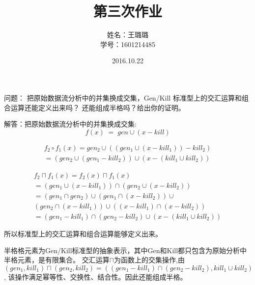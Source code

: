 \documentclass[a4paper,12pt]{article}
\begin{document}
\begin{CJK}{UTF8}{gbsn}
\title{第三次作业}
\author{姓名：王璐璐 \\ 学号：1601214485}
\date{2016.10.22}
\maketitle
	问题：
	把原始数据流分析中的并集换成交集，Gen/Kill
	标准型上的交汇运算和组合运算还能定义出来吗？
	还能组成半格吗？给出你的证明。
	
	解答：把原始数据流分析中的并集换成交集:
	\[
		f\left( x \right)\; =\; gen\cup \left( x-kill \right)
	\]
	
	\[\begin{array}{l}
		{f_2} \circ {f_1}(x) = ge{n_2} \cup ((ge{n_1} \cup (x - kil{l_1})) - kil{l_2})\\
	 	= (ge{n_2} \cup (ge{n_1} - kil{l_2})) \cup (x - (kil{l_1} \cup kil{l_2}))
	\end{array}\]
	
	\[\begin{array}{l}
		{f_2} \sqcap {f_1}(x) = {f_2}(x) \sqcap {f_1}(x)\\
 		= (ge{n_1} \cup (x - kil{l_1})) \cap (ge{n_2} \cup (x - kil{l_2}))\\
		= (ge{n_1} \cap ge{n_2}) \cup (ge{n_1} \cap (x - kil{l_2})) \cup \\
		(ge{n_2} \cap (x - kil{l_1})) \cup ((x - kil{l_1}) \cap (x - kil{l_2}))\\
 		= (ge{n_1} - kil{l_1}) \cap (ge{n_2} - kil{l_2}) \cup (x - (kil{l_1} \cup kil{l_2}))
	\end{array}\]
	
	所以标准型上的交汇运算和组合运算能够定义出来。	

	半格格元素为Gen/Kill标准型的抽象表示，其中Gen和Kill都只包含为原始分析中半格元素，是有限集合。
	交汇运算$\sqcap$为函数上的交集操作,由
	\[(ge{n_1},kil{l_1}) \sqcap (ge{n_2},kil{l_2}) = ((ge{n_1} - kil{l_1}) \cap (ge{n_2} - kil{l_2}),kil{l_1} \cup kil{l_2})\],
	该操作满足幂等性、交换性、结合性。因此还能组成半格。
	
	
\end{CJK}
\end{document}
